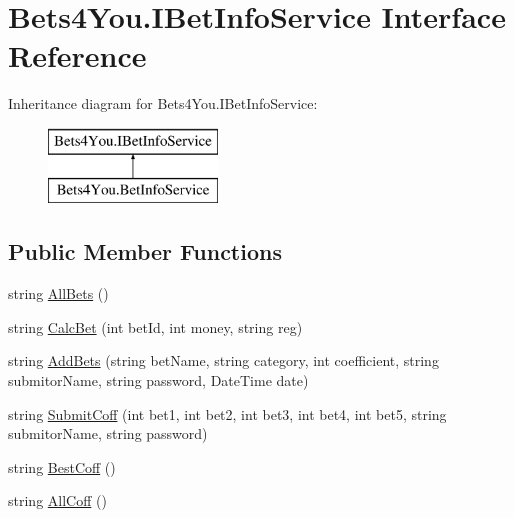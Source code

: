\hypertarget{interface_bets4_you_1_1_i_bet_info_service}{}\section{Bets4\+You.\+I\+Bet\+Info\+Service Interface Reference}
\label{interface_bets4_you_1_1_i_bet_info_service}
Inheritance diagram for Bets4\+You.\+I\+Bet\+Info\+Service\+:\begin{figure}[H]
\begin{center}
\leavevmode
\includegraphics[height=2.000000cm]{interface_bets4_you_1_1_i_bet_info_service}
\end{center}
\end{figure}
\subsection*{Public Member Functions}
\begin{DoxyCompactItemize}
\item 
string \mbox{\hyperlink{interface_bets4_you_1_1_i_bet_info_service_ad0dd9958108c51bd4fe08c1fa9c47a53}{All\+Bets}} ()
\item 
string \mbox{\hyperlink{interface_bets4_you_1_1_i_bet_info_service_a79929162b26a32f83ceac33c5930197f}{Calc\+Bet}} (int bet\+Id, int money, string reg)
\item 
string \mbox{\hyperlink{interface_bets4_you_1_1_i_bet_info_service_a15b9ce927d209a38ee245acf764755b1}{Add\+Bets}} (string bet\+Name, string category, int coefficient, string submitor\+Name, string password, Date\+Time date)
\item 
string \mbox{\hyperlink{interface_bets4_you_1_1_i_bet_info_service_a7f2edf98f56407ad890acfb5c4b839e3}{Submit\+Coff}} (int bet1, int bet2, int bet3, int bet4, int bet5, string submitor\+Name, string password)
\item 
string \mbox{\hyperlink{interface_bets4_you_1_1_i_bet_info_service_a10d69b8875de331135a893a8bb3c057e}{Best\+Coff}} ()
\item 
string \mbox{\hyperlink{interface_bets4_you_1_1_i_bet_info_service_a3b8eab8c72aedf36c5b44c35bf51df4e}{All\+Coff}} ()
\end{DoxyCompactItemize}


